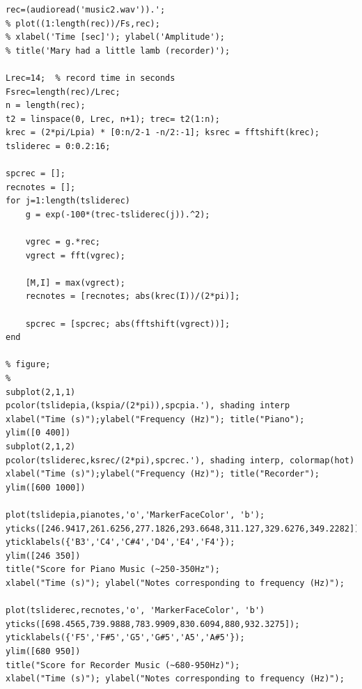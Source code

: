 \documentclass{article}
\begin{document}
\begin{lstlisting}[style=Matlab-editor]
%figure(2)
rec=(audioread('music2.wav')).'; 
% plot((1:length(rec))/Fs,rec);
% xlabel('Time [sec]'); ylabel('Amplitude');
% title('Mary had a little lamb (recorder)');

Lrec=14;  % record time in seconds
Fsrec=length(rec)/Lrec;
n = length(rec);
t2 = linspace(0, Lrec, n+1); trec= t2(1:n);
krec = (2*pi/Lpia) * [0:n/2-1 -n/2:-1]; ksrec = fftshift(krec); 
tsliderec = 0:0.2:16;

spcrec = [];
recnotes = [];
for j=1:length(tsliderec)
    g = exp(-100*(trec-tsliderec(j)).^2);
    
    vgrec = g.*rec;
    vgrect = fft(vgrec);
    
    [M,I] = max(vgrect);
    recnotes = [recnotes; abs(krec(I))/(2*pi)];
    
    spcrec = [spcrec; abs(fftshift(vgrect))];
end

% figure;
% 
subplot(2,1,1)
pcolor(tslidepia,(kspia/(2*pi)),spcpia.'), shading interp
xlabel("Time (s)");ylabel("Frequency (Hz)"); title("Piano");
ylim([0 400])
subplot(2,1,2)
pcolor(tsliderec,ksrec/(2*pi),spcrec.'), shading interp, colormap(hot)
xlabel("Time (s)");ylabel("Frequency (Hz)"); title("Recorder");
ylim([600 1000])

plot(tslidepia,pianotes,'o','MarkerFaceColor', 'b');
yticks([246.9417,261.6256,277.1826,293.6648,311.127,329.6276,349.2282]);
yticklabels({'B3','C4','C#4','D4','E4','F4'});
ylim([246 350])
title("Score for Piano Music (~250-350Hz");
xlabel("Time (s)"); ylabel("Notes corresponding to frequency (Hz)");

plot(tsliderec,recnotes,'o', 'MarkerFaceColor', 'b')
yticks([698.4565,739.9888,783.9909,830.6094,880,932.3275]);
yticklabels({'F5','F#5','G5','G#5','A5','A#5'});
ylim([680 950])
title("Score for Recorder Music (~680-950Hz)");
xlabel("Time (s)"); ylabel("Notes corresponding to frequency (Hz)");
\end{lstlisting}
\end{document}
